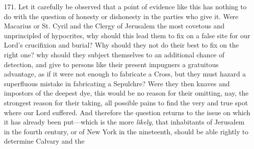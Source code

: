 171.
Let it carefully be observed that a point of evidence like this has
nothing to do with the question of honesty or dishonesty in the
parties who give it. Were Macarius or St. Cyril and the Clergy of
Jerusalem the most covetous and unprincipled of hypocrites, why should
this lead them to fix on a false site for our Lord's crucifixion and
burial? Why should they not do their best to fix on the right one? why
should they subject themselves to an additional chance of detection,
and give to persons like their present impugners a gratuitous
advantage, as if it were not enough to fabricate a Cross, but they
must hazard a superfluous mistake in fabricating a Sepulchre? Were
they then knaves and impostors of the deepest dye, this would be no
reason for their omitting, nay, the strongest reason for their taking,
all possible pains to find the very and true spot where our Lord
suffered. And therefore the question returns to the issue on which it
has already been put—which is the more \emph{likely}, that
inhabitants of Jerusalem in the fourth century, or of New York in the
nineteenth, should be able rightly to determine Calvary and the
